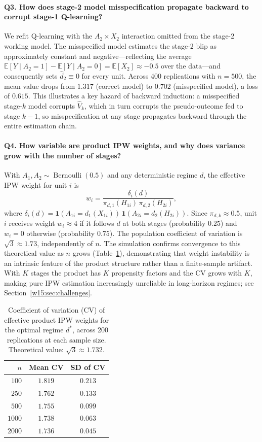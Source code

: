 \documentclass[master.tex]{subfiles}
\begin{document}
\paragraph{Q3. How does stage-2 model misspecification propagate backward to corrupt stage-1 Q-learning?}
We refit Q-learning with the $A_2 \times X_2$ interaction omitted from
the stage-2 working model.  The misspecified model estimates the stage-2
blip as approximately constant and negative---reflecting the average
$\mathbb{E}[Y \mid A_2 = 1] - \mathbb{E}[Y \mid A_2 = 0] = \mathbb{E}[X_2] \approx -0.5$
over the data---and consequently sets $\hat{d}_2 \equiv 0$ for every unit.
Across 400 replications with $n = 500$, the mean value drops from $1.317$
(correct model) to $0.702$ (misspecified model), a loss of $0.615$.
This illustrates a key hazard of backward induction: a misspecified
stage-$k$ model corrupts $\widehat{V}_k$, which in turn corrupts the
pseudo-outcome fed to stage $k-1$, so misspecification at any stage
propagates backward through the entire estimation chain.

\paragraph{Q4. How variable are product IPW weights, and why does variance grow with the number of stages?}
With $A_1, A_2 \sim \operatorname{Bernoulli}(0.5)$ and any deterministic
regime $d$, the effective IPW weight for unit $i$ is
\[
  w_i = \frac{\delta_i(d)}{\pi_{d,1}(H_{1i})\,\pi_{d,2}(H_{2i})},
\]
where $\delta_i(d) = \mathbf{1}(A_{1i} = d_1(X_{1i}))\,
\mathbf{1}(A_{2i} = d_2(H_{2i}))$.
Since $\pi_{d,k} \approx 0.5$, unit $i$ receives weight $w_i \approx 4$
if it follows $d$ at both stages (probability $0.25$) and $w_i = 0$
otherwise (probability $0.75$).  The population coefficient of variation
is $\sqrt{3} \approx 1.73$, independently of $n$.
The simulation confirms convergence to this theoretical value as $n$
grows (Table~\ref{w15:tab:cv}), demonstrating that weight instability is
an intrinsic feature of the product structure rather than a
finite-sample artifact.  With $K$ stages the product has $K$ propensity
factors and the CV grows with $K$, making pure IPW estimation increasingly
unreliable in long-horizon regimes; see Section~\ref{w15:sec:challenges}.

\begin{table}[h]
\centering
\caption{Coefficient of variation (CV) of effective product IPW weights
for the optimal regime $d^*$, across 200 replications at each sample size.
Theoretical value: $\sqrt{3} \approx 1.732$.}
\label{w15:tab:cv}
\begin{tabular}{rcc}
\toprule
$n$ & Mean CV & SD of CV \\
\midrule
$100$   & $1.819$ & $0.213$ \\
$250$   & $1.762$ & $0.133$ \\
$500$   & $1.755$ & $0.099$ \\
$1000$  & $1.738$ & $0.063$ \\
$2000$  & $1.736$ & $0.045$ \\
\bottomrule
\end{tabular}
\end{table}
\end{document}
